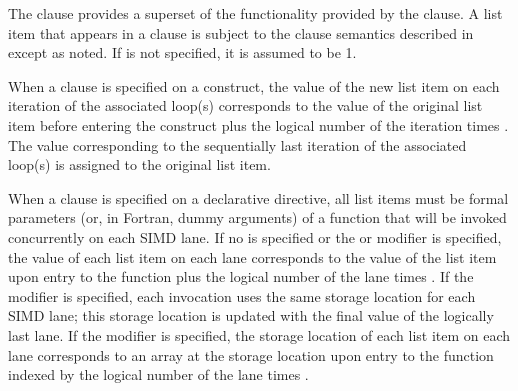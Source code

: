 \descr
The  clause provides a superset of the functionality provided by 
the  clause. A list item that appears in a  clause 
is subject to the  clause semantics described in 
 except as noted. If  is 
not specified, it is assumed to be 1.

When a  clause is specified on a construct, the value of the new 
list item on each iteration of the associated loop(s) corresponds to the value 
of the original list item before entering the construct plus the logical number 
of the iteration times . The value corresponding to the 
sequentially last iteration of the associated loop(s) is assigned to the 
original list item.

When a  clause is specified on a declarative directive, all list 
items must be formal parameters (or, in Fortran, dummy arguments) of a function 
that will be invoked concurrently on each SIMD lane. If no  is 
specified or the  or  modifier is specified, the value of 
each list item on each lane corresponds to the value of the list item upon entry 
to the function plus the logical number of the lane times .
If the  modifier is specified, each invocation uses the same storage 
location for each SIMD lane; this storage location is updated with the final 
value of the logically last lane. If the  modifier is specified, the 
storage location of each list item on each lane corresponds to an array at the 
storage location upon entry to the function indexed by the logical number of 
the lane times .

